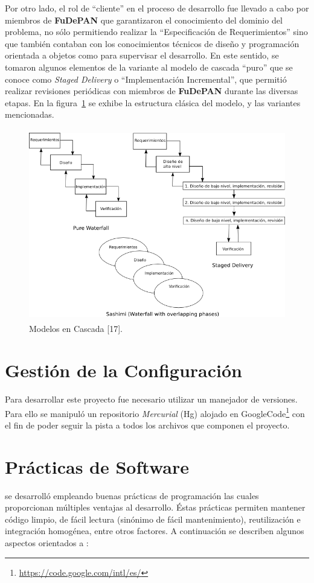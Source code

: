 \par Por otro lado, el rol de ``cliente'' en el proceso de desarrollo fue llevado a cabo por miembros de \textbf{FuDePAN} que garantizaron el conocimiento del dominio del problema, no sólo permitiendo realizar la ``Especificación de Requerimientos'' sino que también contaban con los conocimientos técnicos de diseño y programación orientada a objetos como para supervisar el desarrollo. En este sentido, se tomaron algunos elementos de la variante al modelo de cascada “puro” que se conoce como \emph{Staged Delivery}\cite{Mcconnell96} o ``Implementación Incremental'', que permitió realizar revisiones periódicas con miembros de \textbf{FuDePAN} durante las diversas etapas. En la figura~\ref{cascade} se exhibe la estructura clásica del modelo, y las variantes mencionadas.

\begin{figure} [h]
	\hspace*{1cm}\includegraphics[width=5.2209in,height=3.300in]{image/modelOfCascade.png}
	\caption{Modelos en Cascada [17].}	
	\label{cascade}
\end{figure}

\section{Gestión de la Configuración}
\par Para desarrollar este proyecto fue necesario utilizar un manejador de versiones. Para ello se manipuló un repositorio \emph{Mercurial} (Hg) alojado en GoogleCode\footnote{\url{https://code.google.com/intl/es/}} con el fin de poder seguir la pista a todos los archivos que componen el proyecto.

\section{Prácticas de Software}
\par \remo se desarrolló empleando buenas prácticas de programación las cuales proporcionan múltiples ventajas al desarrollo. Éstas prácticas permiten mantener código limpio, de fácil lectura (sinónimo de fácil mantenimiento), reutilización e integración homogénea, entre otros factores.
A continuación se describen algunos aspectos orientados a \remo:


